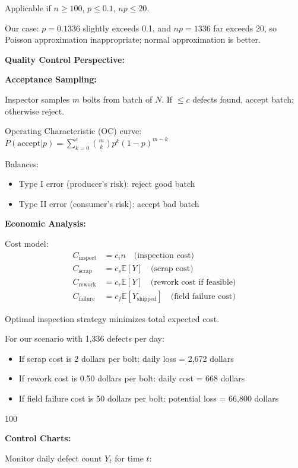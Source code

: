 \documentclass[12pt]{article}
\begin{document}
\begin{explanation}
Applicable if $n \geq 100$, $p \leq 0.1$, $np \leq 20$.

Our case: $p = 0.1336$ slightly exceeds 0.1, and $np = 1336$ far exceeds 20, so Poisson approximation inappropriate; normal approximation is better.

\textbf{Quality Control Perspective:}

\textbf{Acceptance Sampling:}

Inspector samples $m$ bolts from batch of $N$. If $\leq c$ defects found, accept batch; otherwise reject.

Operating Characteristic (OC) curve: $P(\text{accept} | p) = \sum_{k=0}^c \binom{m}{k}p^k(1-p)^{m-k}$

Balances:
\begin{itemize}
    \item Type I error (producer's risk): reject good batch
    \item Type II error (consumer's risk): accept bad batch
\end{itemize}

\textbf{Economic Analysis:}

Cost model:
\begin{align*}
C_{\text{inspect}} &= c_i n \quad \text{(inspection cost)} \\
C_{\text{scrap}} &= c_s \mathbb{E}[Y] \quad \text{(scrap cost)} \\
C_{\text{rework}} &= c_r \mathbb{E}[Y] \quad \text{(rework cost if feasible)} \\
C_{\text{failure}} &= c_f \mathbb{E}[Y_{\text{shipped}}] \quad \text{(field failure cost)}
\end{align*}

Optimal inspection strategy minimizes total expected cost.

For our scenario with 1,336 defects per day:
\begin{itemize}
    \item If scrap cost is 2 dollars per bolt: daily loss = 2,672 dollars
    \item If rework cost is 0.50 dollars per bolt: daily cost = 668 dollars
    \item If field failure cost is 50 dollars per bolt: potential loss = 66,800 dollars
\end{itemize}

100%

\textbf{Control Charts:}

Monitor daily defect count $Y_t$ for time $t$:


\end{explanation}
\end{document}
